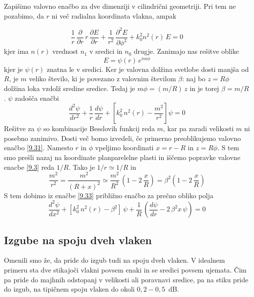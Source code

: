 Zapišimo valovno enačbo za dve dimenziji v cilindrični
geometriji. Pri tem ne pozabimo, da $r$ ni več radialna koordinata vlakna, ampak

\begin{equation}
\frac{1}{r}\,\frac{\partial}{\partial r}\, r\,\frac{\partial E}{\partial r}+\frac{1}{r^{2}}\,\frac{\partial^{2}E}{\partial\phi^{2}}+k_{0}^{2}n^{2}\left(r\right)\, E=0\label{9.31}
\end{equation}
 kjer ima $n\left(r\right)$ vrednost $n_{1}$ v sredici in $n_{0}$
drugje. Zanimajo nas rešitve oblike 
\begin{equation}
E=\psi\left(r\right)\, e^{im\phi}\label{9.32}
\end{equation}
 kjer je $\psi\left(r\right)$ znatna le v sredici. Ker je valovna
dolžina svetlobe dosti manjša od $R$, je $m$ veliko število, ki
je povezano z valovnim številom $\beta$: naj bo $z=R\phi$ dolžina
loka vzdolž sredine sredice. Tedaj je $m\phi=(m/R)\, z$ in je torej
$\beta=m/R$. $\psi$ zadošča enačbi 
\begin{equation}
\frac{d^{2}\psi}{dr^{2}}+\frac{1}{r}\,\frac{d\psi}{dr}+\left[k_{0}^{2}\, n^{2}\left(r\right)-\frac{m^{2}}{r^{2}}\right]\psi=0\label{9.33}
\end{equation}
 Rešitve za $\psi$ so kombinacije Besslovih funkcij reda $m$, kar
pa zaradi velikosti $m$ ni posebno zanimivo. Dosti več bomo izvedeli,
če primerno preoblikujemo valovno enačbo \ref{9.31}. Namesto $r$
in $\phi$ vpeljimo koordinati $x=r-R$ in $z=R\phi$. S tem smo prešli
nazaj na koordinate planparelelne plasti in iščemo popravke valovne
enacbe \ref{9.3} reda $1/R.$ Tako je $1/r\simeq1/R$ in 
\begin{equation}
\frac{m^{2}}{r^{2}}=\frac{m^{2}}{\left(R+x\right)^{2}}\simeq\frac{m^{2}}{R^{2}}\,\left(1-2\,\frac{x}{R}\right)=\beta^{2}\left(1-2\,\frac{x}{R}\right)\label{9.34}
\end{equation}
 S tem dobimo iz enačbe \ref{9.33} približno enačbo za prečno obliko
polja 
\begin{equation}
\frac{d^{2}\psi}{dx^{2}}+\left[k_{0}^{2}\, n^{2}\left(r\right)-\beta^{2}\right]\,\psi+\frac{1}{R}\,\left(\frac{d\psi}{dr}-2\,\beta^{2}x\,\psi\right)=0\label{9.35}
\end{equation}

\subsection*{Izgube na spoju dveh vlaken}
Omenili smo že, da pride do izgub tudi na spoju dveh vlaken. 
V idealnem primeru sta dve stikajoči vlakni povsem enaki in se sredici povsem ujemata. 
Čim pa pride do majhnih odstopanj v velikosti ali poravnavi sredice, pa na stiku pride 
do izgub, na tipičnem spoju vlaken do okoli $0,2-0,5$~dB.

